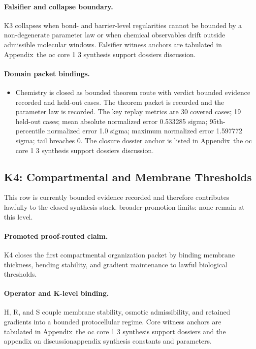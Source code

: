 \paragraph{Falsifier and collapse boundary.}
K3 collapses when bond- and barrier-level regularities cannot be bounded by a non-degenerate parameter law or when chemical observables drift outside admissible molecular windows.
Falsifier witness anchors are tabulated in Appendix~the oc core 1 3 synthesis support dossiers discussion.

\paragraph{Domain packet bindings.}
\begin{itemize}[leftmargin=1.6em,nosep]
\item Chemistry is closed as bounded theorem route with verdict bounded evidence recorded and  held-out cases. The theorem packet is recorded and the parameter law is recorded. The key replay metrics are 30 covered cases; 19 held-out cases; mean absolute normalized error 0.533285 sigma; 95th-percentile normalized error 1.0 sigma; maximum normalized error 1.597772 sigma; tail breaches 0. The closure dossier anchor is listed in Appendix~the oc core 1 3 synthesis support dossiers discussion.
\end{itemize}

\subsection{K4: Compartmental and Membrane Thresholds}
\label{sec:oc-core-1-3-synthesis-k4}
This row is currently bounded evidence recorded and therefore contributes lawfully to the closed synthesis stack.
broader-promotion limits: none remain at this level.

\paragraph{Promoted proof-routed claim.}
K4 closes the first compartmental organization packet by binding membrane thickness, bending stability, and gradient maintenance to lawful biological thresholds.

\paragraph{Operator and K-level binding.}
H, R, and S couple membrane stability, osmotic admissibility, and retained gradients into a bounded protocellular regime.
Core witness anchors are tabulated in Appendix~the oc core 1 3 synthesis support dossiers and the appendix on discussionappendix synthesis constants and parameters.

